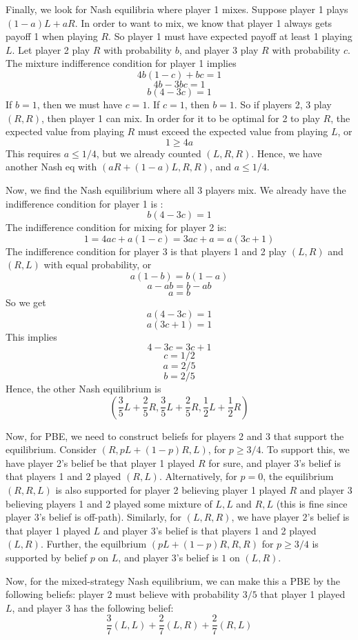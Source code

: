 \documentclass[10pt,letter]{article}
\begin{document}
Finally, we look for Nash equilibria where player 1 mixes. Suppose player 1 plays $(1-a)L + aR$. In order to want to mix, we know that player 1 always gets payoff 1 when playing $R$. So player 1 must have expected payoff at least 1 playing $L$. Let player 2 play $R$ with probability $b$, and player 3 play $R$ with probability $c$. The mixture indifference condition for player 1 implies
\[ 4b(1-c) + bc = 1 \]
\[ 4b - 3bc = 1 \]
\[ b(4 - 3c) = 1 \]
If $b=1$, then we must have $c=1$. If $c=1$, then $b=1$. So if players 2, 3 play $(R,R)$, then player 1 can mix. In order for it to be optimal for 2 to play $R$, the expected value from playing $R$ must exceed the expected value from playing $L$, or
\[ 1 \ge  4a  \]
This requires $a \le 1/4$, but we already counted $(L,R,R)$. Hence, we have another Nash eq with $(aR + (1-a)L, R, R)$, and $a \le 1/4$.

Now, we find the Nash equilibrium where all 3 players mix. We already have the indifference condition for player 1 is :
\[ b(4 - 3c) = 1 \]
The indifference condition for mixing for player 2 is:
\[ 1 = 4ac + a(1-c) = 3ac + a = a(3c + 1) \]
The indifference condition for player 3 is that players 1 and 2 play $(L,R)$ and $(R, L)$ with equal probability, or
\[ a(1-b) = b(1-a) \]
\[ a - ab = b - ab \]
\[ a = b \]
So we get
\[ a(4 - 3c) = 1 \]
\[ a(3c + 1) = 1 \]
This implies
\[ 4 - 3c = 3c + 1 \]
\[ c = 1/2 \]
\[ a = 2/5 \]
\[ b = 2/5 \]
Hence, the other Nash equilibrium is
\[ \left( \frac{3}{5}L + \frac{2}{5}R,\frac{3}{5}L + \frac{2}{5}R,\frac{1}{2}L + \frac{1}{2}R \right) \]

Now, for PBE, we need to construct beliefs for players 2 and 3 that support the equilibrium. Consider $(R, pL + (1-p)R, L)$, for $p \ge 3/4$. To support this, we have player 2's belief be that player 1 played $R$ for sure, and player 3's belief is that players 1 and 2 played $(R, L)$. Alternatively, for $p = 0$, the equilibrium $(R, R, L)$ is also supported for player 2 believing player 1 played $R$ and player 3 believing players 1 and 2 played some mixture of $L,L$ and $R,L$ (this is fine since player 3's belief is off-path). Similarly, for $(L,R,R)$, we have player 2's belief is that player 1 played $L$ and player 3's belief is that players 1 and 2 played $(L,R)$. Further, the equilbrium $(pL + (1-p)R, R, R)$ for $p \ge 3/4$ is supported by belief $p$ on $L$, and player 3's belief is $1$ on $(L,R)$.

Now, for the mixed-strategy Nash equilibrium, we can make this a PBE by the following beliefs: player 2 must believe with probability $3/5$ that player 1 played $L$, and player 3 has the following belief:
\[ \frac{3}{7}(L,L) + \frac{2}{7}(L,R) + \frac{2}{7}(R,L) \]
\end{document}
